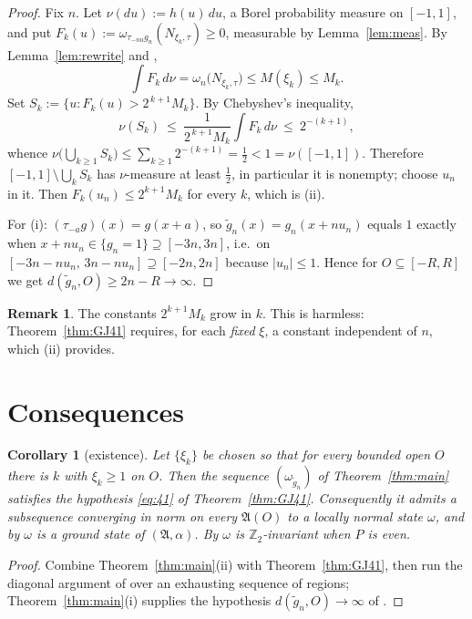 \documentclass[11pt,a4paper]{article}
\theoremstyle{plain}
\newtheorem{corollary}[theorem]{Corollary}
\theoremstyle{definition}
\newtheorem{remark}[theorem]{Remark}
\newcommand{\A}{\mathfrak{A}}
\begin{document}
\begin{proof}
Fix $n$. Let $\nu(du):=h(u)\,du$, a Borel probability measure on $[-1,1]$, and put
$F_k(u):=\omega_{\tau_{-nu}g_n}(N_{\xi_k,\tau})\ge0$, measurable by Lemma~\ref{lem:meas}. By
Lemma~\ref{lem:rewrite} and \cite[Thm.~3.3.1(b)]{GJIII},
\[
  \int F_k\,d\nu=\omega_n\bigl(N_{\xi_k,\tau}\bigr)\le M(\xi_k)\le M_k .
\]
Set $S_k:=\{u: F_k(u)>2^{\,k+1}M_k\}$. By Chebyshev's inequality,
\[
  \nu(S_k)\ \le\ \frac{1}{2^{\,k+1}M_k}\int F_k\,d\nu\ \le\ 2^{-(k+1)} ,
\]
whence $\nu\bigl(\bigcup_{k\ge1}S_k\bigr)\le\sum_{k\ge1}2^{-(k+1)}=\tfrac12<1=\nu([-1,1])$.
Therefore $[-1,1]\setminus\bigcup_kS_k$ has $\nu$-measure at least $\tfrac12$, in particular it is
nonempty; choose $u_n$ in it. Then $F_k(u_n)\le 2^{k+1}M_k$ for every $k$, which is (ii).

For (i): $(\tau_{-a}g)(x)=g(x+a)$, so $\tilde g_n(x)=g_n(x+nu_n)$ equals $1$ exactly when
$x+nu_n\in\{g_n=1\}\supseteq[-3n,3n]$, i.e.\ on $[-3n-nu_n,\,3n-nu_n]\supseteq[-2n,2n]$ because
$|u_n|\le1$. Hence for $O\subseteq[-R,R]$ we get $d(\tilde g_n,O)\ge 2n-R\to\infty$.
\end{proof}

\begin{remark}
The constants $2^{k+1}M_k$ grow in $k$. This is harmless: Theorem~\ref{thm:GJ41} requires, for each
\emph{fixed} $\xi$, a constant independent of $n$, which (ii) provides.
\end{remark}

\section{Consequences}

\begin{corollary}[existence]\label{cor:exist}
Let $\{\xi_k\}$ be chosen so that for every bounded open $O$ there is $k$ with $\xi_k\ge1$ on $O$.
Then the sequence $(\omega_{\tilde g_n})$ of Theorem~\ref{thm:main} satisfies the hypothesis
\eqref{eq:41} of Theorem~\ref{thm:GJ41}. Consequently it admits a subsequence converging in norm
on every $\A(O)$ to a locally normal state $\omega$, and by \cite[Thm.~4.2]{M0} $\omega$ is a
ground state of $(\A,\alpha)$. By \cite[Lem.~3.3]{M0} $\omega$ is $\mathbb Z_2$-invariant when $P$
is even.
\end{corollary}

\begin{proof}
Combine Theorem~\ref{thm:main}(ii) with Theorem~\ref{thm:GJ41}, then run the diagonal argument of
\cite[Cor.~4.3]{M0} over an exhausting sequence of regions; Theorem~\ref{thm:main}(i) supplies the
hypothesis $d(\tilde g_n,O)\to\infty$ of \cite[Thm.~4.2]{M0}.
\end{proof}
\end{document}

